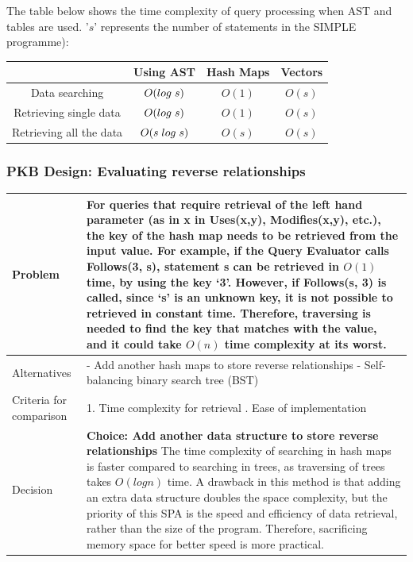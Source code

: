 \documentclass[12pt]{article}
\begin{document}
{{{{{{{{{{{{{\begin{tabular}{|L{5cm} | L{12cm}| }
 \\
 \hline
\end{tabular}
\newline The table below shows the time complexity of query processing when AST and tables are used. '$s$' represents the number of statements in the SIMPLE programme):
\begin{table}[htbp]
\begin{tabular}{|c|c|c|c|}
\hline
 & Using AST & Hash Maps & Vectors\\
\hline
Data searching & $O(log\hspace{1mm}s)$ & $O(1)$ & $O(s)$\\
\hline
Retrieving single data & $O(log\hspace{1mm}s)$& $O(1)$ & $O(s)$\\
\hline
Retrieving all the data & $O(s\hspace{1mm}log\hspace{1mm}s)$ & $O(s)$ & $O(s)$\\
\hline
\end{tabular}
\end{table}
\subsubsection{PKB Design: Evaluating reverse relationships}
\begin{tabular}{|L{5cm} | L{12cm}| }
\hline
Problem &
For queries that require retrieval of the left hand parameter (as in x in Uses(x,y), Modifies(x,y), etc.), the key of the hash map needs to be retrieved from the input value. For example, if the Query Evaluator calls Follows(3, s), statement s can be retrieved in $O(1)$ time, by using the key ‘3’. However, if Follows(s, 3) is called, since ‘s’ is an unknown key, it is not possible to retrieved in constant time. Therefore, traversing is needed to find the key that matches with the value, and it could take $O(n)$ time complexity at its worst.
 \\
    \hline
    Alternatives &
- Add another hash maps to store reverse relationships
\newline - Self-balancing binary search tree (BST) 
 \\
\hline
    Criteria for comparison &
1. Time complexity for retrieval
. Ease of implementation
 \\
 \hline
   Decision & \textbf{Choice: Add another data structure to store reverse relationships}
\newline
The time complexity of searching in hash maps is faster compared to searching in trees, as traversing of trees takes $O(log n)$ time. A drawback in this method is that adding an extra data structure doubles the space complexity, but the priority of this SPA is the speed and efficiency of data retrieval, rather than the size of the program. Therefore, sacrificing memory space for better speed is more practical.
 \\
 \hline
\end{tabular}
}}}}}}}}}}}}}
\end{document}
